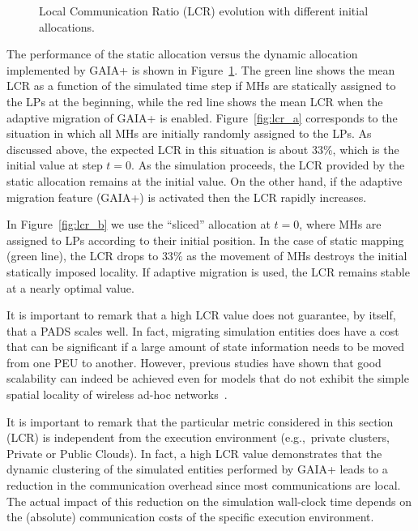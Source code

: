 \documentclass[1p]{elsarticle}
\begin{document}
\begin{figure}[ht]
\centering
{}
\caption{Local Communication Ratio (LCR) evolution with different
  initial allocations.}
\label{fig:lcr}
\end{figure}

The performance of the static allocation versus the dynamic allocation
implemented by GAIA+ is shown in Figure~\ref{fig:lcr}. The green line
shows the mean LCR as a function of the simulated time step if MHs are
statically assigned to the LPs at the beginning, while the red line
shows the mean LCR when the adaptive migration of GAIA+ is
enabled. Figure~\ref{fig:lcr_a} corresponds to the situation in which
all MHs are initially randomly assigned to the LPs. As discussed
above, the expected LCR in this situation is about $33\%$, which is
the initial value at step $t=0$. As the simulation proceeds, the LCR
provided by the static allocation remains at the initial value.  On
the other hand, if the adaptive migration feature (GAIA+) is activated
then the LCR rapidly increases.

In Figure~\ref{fig:lcr_b} we use the ``sliced'' allocation at $t=0$,
where MHs are assigned to LPs according to their initial position.  In
the case of static mapping (green line), the LCR drops to $33\%$ as
the movement of MHs destroys the initial statically imposed
locality. If adaptive migration is used, the LCR remains stable at a
nearly optimal value.

It is important to remark that a high LCR value does not guarantee, by
itself, that a PADS scales well. In fact, migrating simulation
entities does have a cost that can be significant if a large amount of
state information needs to be moved from one PEU to another. However,
previous studies have shown that good scalability can indeed be
achieved even for models that do not exhibit the simple spatial
locality of wireless ad-hoc networks~\cite{gda-mospas-11}.

It is important to remark that the particular metric considered in
this section (LCR) is independent from the execution environment
(e.g.,~private clusters, Private or Public Clouds). In fact, a high
LCR value demonstrates that the dynamic clustering of the simulated
entities performed by GAIA+ leads to a reduction in the communication
overhead since most communications are local. The actual impact of
this reduction on the simulation wall-clock time depends on the
(absolute) communication costs of the specific execution environment.
\end{document}
